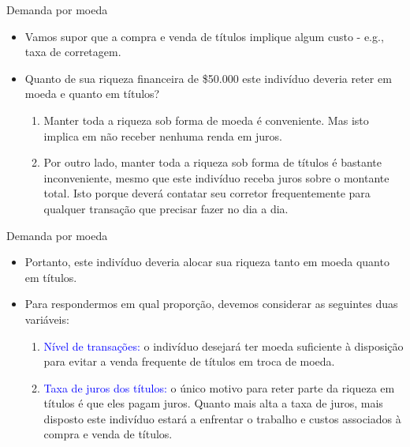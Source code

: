 \documentclass[10pt]{beamer}
\begin{document}
\begin{frame}{Demanda por moeda}
    \begin{itemize}
        \item Vamos supor que a compra e venda de títulos implique algum custo - e.g., taxa de corretagem.
        \bigskip
        \item Quanto de sua riqueza financeira de \$50.000 este indivíduo deveria reter em moeda e quanto em títulos?
        \bigskip
        \begin{enumerate}
            \item Manter toda a riqueza sob forma de moeda é conveniente. Mas isto implica em não receber nenhuma renda em juros.
            \bigskip
            \item Por outro lado, manter toda a riqueza sob forma de títulos é bastante inconveniente, mesmo que este indivíduo receba juros sobre o montante total. Isto porque deverá contatar seu corretor frequentemente para qualquer transação que precisar fazer no dia a dia.
        \end{enumerate}
    \end{itemize}
\end{frame}

\begin{frame}{Demanda por moeda}
    \begin{itemize}
        \item Portanto, este indivíduo deveria alocar sua riqueza tanto em moeda quanto em títulos.
        \bigskip
        \item Para respondermos em qual proporção, devemos considerar as seguintes duas variáveis:
        \bigskip
        \begin{enumerate}
            \item \textcolor{blue}{Nível de transações:} o indivíduo desejará ter moeda suficiente à disposição para evitar a venda frequente de títulos em troca de moeda.
            \bigskip
            \item \textcolor{blue}{Taxa de juros dos títulos:} o único motivo para reter parte da riqueza em títulos é que eles pagam juros. Quanto mais alta a taxa de juros, mais disposto este indivíduo estará a enfrentar o trabalho e custos associados à compra e venda de títulos.
        \end{enumerate}
    \end{itemize}
\end{frame}
\end{document}
